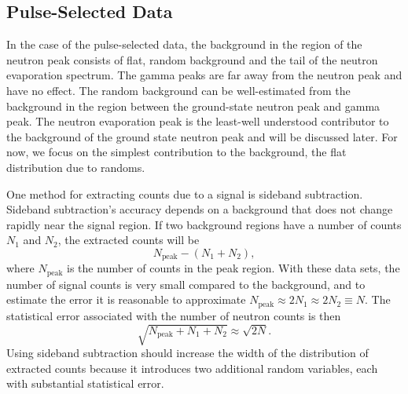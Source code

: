\subsection{Pulse-Selected Data}
In the case of the pulse-selected data, the background in the region of the neutron peak consists of flat, random background and the tail of the neutron evaporation spectrum.  The gamma peaks are far away from the neutron peak and have no effect.  The random background can be well-estimated from the background in the region between the ground-state neutron peak and gamma peak.  The neutron evaporation peak is the least-well understood contributor to the background of the ground state neutron peak and will be discussed later.  For now, we focus on the simplest contribution to the background, the flat distribution due to randoms.

One method for extracting counts due to a signal is sideband subtraction.  Sideband subtraction's accuracy depends on a background that does not change rapidly near the signal region.  If two background regions have a number of counts $N_1$ and $N_2$, the extracted counts will be
\begin{equation}
N_{\text{peak}} - (N_1 + N_2),
\end{equation}
where $N_{\text{peak}}$ is the number of counts in the peak region.  With these data sets, the number of signal counts is very small compared to the background, and to estimate the error it is reasonable to approximate $N_{\text{peak}} \approx 2 N_1 \approx 2 N_2 \equiv N$.  The statistical error associated with the number of neutron counts is then
\begin{equation}
\sqrt{N_{\text{peak}} + N_1 + N_2} \approx \sqrt{2 N}.
\end{equation}
Using sideband subtraction should increase the width of the distribution of extracted counts because it introduces two additional random variables, each with substantial statistical error.  

